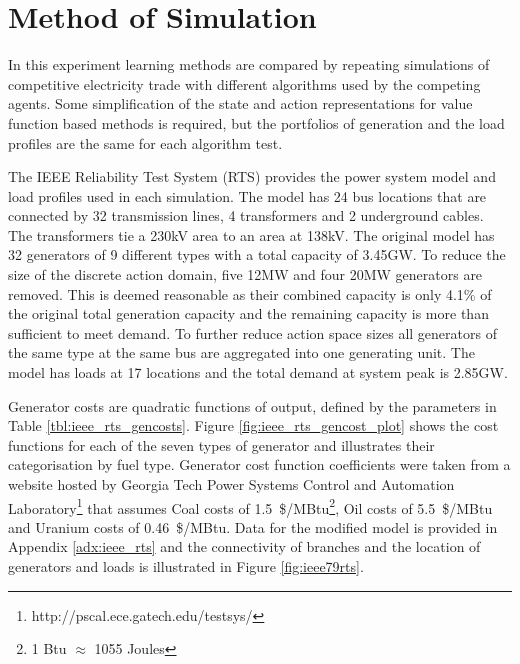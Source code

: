 \section{Method of Simulation}
In this experiment learning methods are compared by repeating simulations of
competitive electricity trade with different algorithms used by the competing
agents. Some simplification of the state and action representations for value
function based methods is required, but the portfolios of generation and
the load profiles are the same for each algorithm test.

The IEEE Reliability Test System (RTS) provides the power system model and load
profiles used in each simulation.  The model has 24 bus locations that are
connected by 32 transmission lines, 4 transformers and 2 underground cables. The
transformers tie a 230kV area to an area at 138kV.  The original model has 32
generators of 9 different types with a total capacity of 3.45GW.  To reduce the
size of the discrete action domain, five 12MW and four 20MW generators are
removed.  This is deemed reasonable as their combined capacity is only 4.1\% of
the original total generation capacity and the remaining capacity is more than
sufficient to meet demand.  To further reduce action space sizes all generators
of the same type at the same bus are aggregated into one generating unit. The
model has loads at 17 locations and the total demand at system peak is 2.85GW.

Generator costs are quadratic functions of output, defined by the parameters in
Table \ref{tbl:ieee_rts_gencosts}. Figure \ref{fig:ieee_rts_gencost_plot} shows
the cost functions for each of the seven types of generator and illustrates
their categorisation by fuel type.  Generator cost function coefficients were
taken from a website hosted by Georgia Tech Power Systems Control and Automation
Laboratory\footnote{http://pscal.ece.gatech.edu/testsys/} that assumes Coal
costs of 1.5~\$/MBtu\footnote{1 Btu $\approx$ 1055 Joules}, Oil costs of
5.5~\$/MBtu and Uranium costs of 0.46~\$/MBtu.  Data for the modified model is
provided in Appendix \ref{adx:ieee_rts} and the connectivity of branches and the
location of generators and loads is illustrated in Figure \ref{fig:ieee79rts}.

